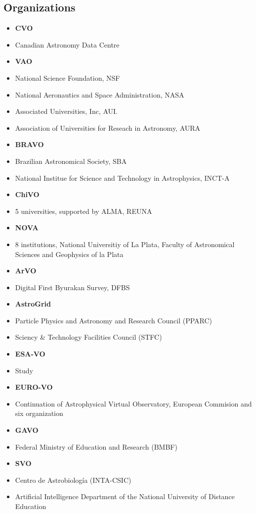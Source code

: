 \subsection{Organizations}
\begin{itemize}
	\item \textbf{CVO}
	\item Canadian Astronomy Data Centre
	\item \textbf{VAO}
	\item National Science Foundation, NSF
	\item National Aeronautics and Space Administration, NASA 
	\item Associated Universities, Inc, AUI.
	\item Association of Universities for Reseach in Astronomy, AURA
	\item \textbf{BRAVO}
	\item Brazilian Astronomical Society, SBA
	\item National Institue for Science and Technology in Astrophysics, INCT-A
	\item \textbf{ChiVO}
	\item 5 universities, supported by ALMA, REUNA
	\item \textbf{NOVA}
	\item 8 institutions, National Universitiy of La Plata, Faculty of Astronomical 
		Sciences and Geophysics of la Plata
	\item \textbf{ArVO}
	\item Digital First Byurakan Survey, DFBS
	\item \textbf{AstroGrid}
	\item Particle Physics and Astronomy and Research Council  (PPARC)
	\item Sciency & Technology Facilities Council (STFC)
	\item \textbf{ESA-VO}
	\item Study
	\item \textbf{EURO-VO}
	\item Continuation of Astrophysical Virtual Observatory, European Commision and six organization
	\item \textbf{GAVO}
	\item Federal Ministry of Education and Research (BMBF)
	\item \textbf{SVO}
	\item Centro de Astrobiología (INTA-CSIC)
	\item Artificial Intelligence Department of the National University of Distance Education

\end{itemize}
